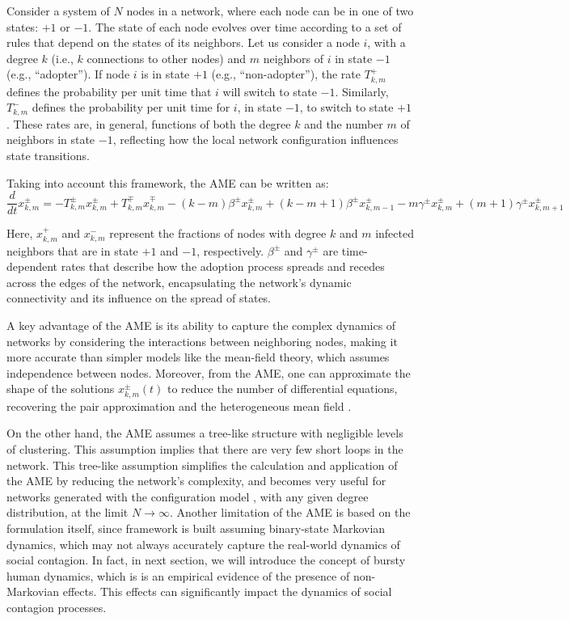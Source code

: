 Consider a system of $N$ nodes in a network, where each node can be in one of two states: $+1$ or $-1$. The state of each node evolves over time according to a set of rules that depend on the states of its neighbors. Let us consider a node $i$, with a degree $k$ (i.e., $k$ connections to other nodes) and $m$ neighbors of $i$ in state $-1$ (e.g., ``adopter''). If node $i$ is in state $+1$ (e.g., ``non-adopter''), the rate \( T^{+}_{k,m} \) defines the probability per unit time that $i$ will switch to state $-1$. Similarly, \( T^{-}_{k,m} \) defines the probability per unit time for $i$, in state $-1$, to switch to state $+1$. These rates are, in general, functions of both the degree $k$ and the number $m$ of neighbors in state $-1$, reflecting how the local network configuration influences state transitions.

Taking into account this framework, the AME can be written as:
\begin{equation}
    \frac{d}{dt} x^{\pm}_{k,m} = -T^{\pm}_{k,m} x^{\pm}_{k,m} + T^{\mp}_{k,m} x^{\mp}_{k,m} - (k-m) \beta^{\pm} x^{\pm}_{k,m} + (k-m+1) \beta^{\pm} x^{\pm}_{k,m-1} - m \gamma^{\pm} x^{\pm}_{k,m} + (m+1) \gamma^{\pm} x^{\pm}_{k,m+1}
\end{equation}

Here, $x^{+}_{k,m}$ and $x^{-}_{k,m}$ represent the fractions of nodes with degree $k$ and $m$ infected neighbors that are in state $+1$ and $-1$, respectively. $\beta^{\pm}$ and $\gamma^{\pm}$ are time-dependent rates that describe how the adoption process spreads and recedes across the edges of the network, encapsulating the network's dynamic connectivity and its influence on the spread of states.

A key advantage of the AME is its ability to capture the complex dynamics of networks by considering the interactions between neighboring nodes, making it more accurate than simpler models like the mean-field theory, which assumes independence between nodes. Moreover, from the AME, one can approximate the shape of the solutions $x^{\pm}_{k,m} (t)$ to reduce the number of differential equations, recovering the pair approximation and the heterogeneous mean field \cite{gleeson-2011,gleeson-2013}.

On the other hand, the AME assumes a tree-like structure with negligible levels of clustering. This assumption implies that there are very few short loops in the network. This tree-like assumption simplifies the calculation and application of the AME by reducing the network's complexity, and becomes very useful for networks generated with the configuration model \cite{newman-book}, with any given degree distribution, at the limit $N \to \infty$. Another limitation of the AME is based on the formulation itself, since framework is built assuming binary-state Markovian dynamics, which may not always accurately capture the real-world dynamics of social contagion. In fact, in next section, we will introduce the concept of bursty human dynamics, which is is an empirical evidence of the presence of non-Markovian effects. This effects can significantly impact the dynamics of social contagion processes.

